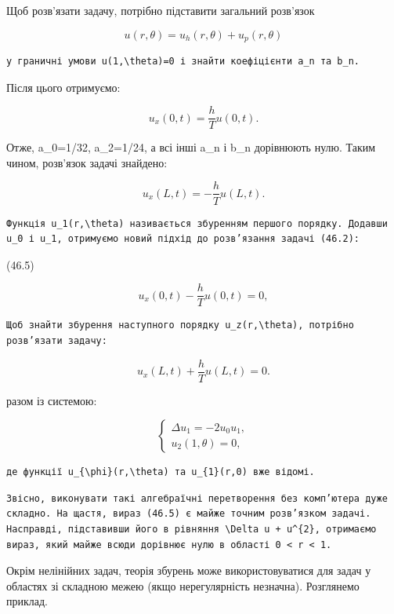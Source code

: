 \documentclass[
  ukrainian,
]{article}
\begin{document}
Щоб розв'язати задачу, потрібно підставити загальний розв'язок

\[
u(r,\theta)=u_h(r,\theta)+u_p(r,\theta)
\]

\begin{verbatim}
у граничні умови u(1,\theta)=0 і знайти коефіцієнти a_n та b_n.
\end{verbatim}

Після цього отримуємо:

\[
u_x(0,t) = \frac{h}{T} u(0,t).
\]

Отже, a\_0=1/32, a\_2=1/24, а всі інші a\_n і b\_n дорівнюють нулю.
Таким чином, розв'язок задачі знайдено:

\[
u_x(L,t) = -\frac{h}{T} u(L,t).
\]

\begin{verbatim}
Функція u_1(r,\theta) називається збуренням першого порядку. Додавши u_0 і u_1, отримуємо новий підхід до розв’язання задачі (46.2):
\end{verbatim}

(46.5)

\[
u_x(0,t) - \frac{h}{T}u(0,t) = 0,
\]

\begin{verbatim}
Щоб знайти збурення наступного порядку u_z(r,\theta), потрібно розв’язати задачу:
\end{verbatim}

\[
u_x(L,t) + \frac{h}{T}u(L,t) = 0.
\]

разом із системою:

\[
\begin{cases}
\Delta u_{1} = -2u_{0}u_{1}, \\
u_{2}(1,\theta) = 0,
\end{cases}
\]

\begin{verbatim}
де функції u_{\phi}(r,\theta) та u_{1}(r,0) вже відомі.
\end{verbatim}

\begin{verbatim}
Звісно, виконувати такі алгебраїчні перетворення без комп’ютера дуже складно. На щастя, вираз (46.5) є майже точним розв’язком задачі. Насправді, підставивши його в рівняння \Delta u + u^{2}, отримаємо вираз, який майже всюди дорівнює нулю в області 0 < r < 1.
\end{verbatim}

Окрім нелінійних задач, теорія збурень може використовуватися для задач
у областях зі складною межею (якщо нерегулярність незначна). Розглянемо
приклад.
\end{document}
